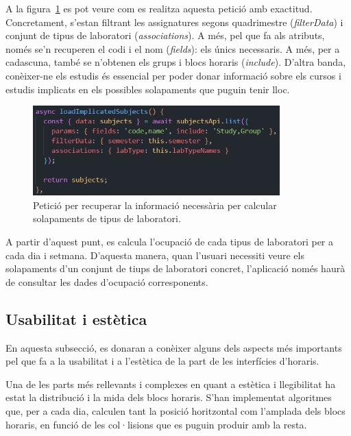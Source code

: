\documentclass[a4paper,12pt]{ThesisStyle}
\begin{document}
A la figura~\ref{img:cridaAssignatures} es pot veure com es realitza aquesta petició amb exactitud. Concretament, s'estan filtrant les assignatures segons quadrimestre (\textit{filterData}) i conjunt de tipus de laboratori (\textit{associations}). A més, pel que fa als atributs, només se'n recuperen el codi i el nom (\textit{fields}): els únics necessaris. A més, per a cadascuna, també se n'obtenen els grups i blocs horaris (\textit{include}). D'altra banda, conèixer-ne els estudis és essencial per poder donar informació sobre els cursos i estudis implicats en els possibles solapaments que puguin tenir lloc.

\begin{figure}[H]
  \centering
  \includegraphics[width=0.85\textwidth]{assets/code/solapaments/cridaAssignatures.png}
  \caption{\label{img:cridaAssignatures} Petició per recuperar la informació necessària per calcular solapaments de tipus de laboratori.}
\end{figure}

A partir d'aquest punt, es calcula l'ocupació de cada tipus de laboratori per a cada dia i setmana. D'aquesta manera, quan l'usuari necessiti veure els solapaments d'un conjunt de tiups de laboratori concret, l'aplicació només haurà de consultar les dades d'ocupació corresponents.

\subsection{Usabilitat i estètica}
\label{subsec:usabilitat_estetica}

En aquesta subsecció, es donaran a conèixer alguns dels aspects més importants pel que fa a la usabilitat i a l'estètica de la part de les interfícies d'horaris.

Una de les parts més rellevants i complexes en quant a estètica i llegibilitat ha estat la distribució i la mida dels blocs horaris. S'han implementat algoritmes que, per a cada dia, calculen tant la posició horitzontal com l'amplada dels blocs horaris, en funció de les col·lisions que es puguin produir amb la resta.
\end{document}
